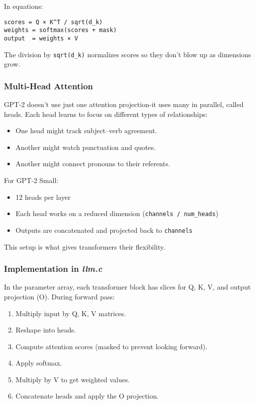 \documentclass[
  letterpaper,
  DIV=11,
  numbers=noendperiod]{scrreprt}
\providecommand{\tightlist}{%
  \setlength{\itemsep}{0pt}\setlength{\parskip}{0pt}}
\begin{document}
In equations:

\begin{verbatim}
scores = Q × K^T / sqrt(d_k)
weights = softmax(scores + mask)
output  = weights × V
\end{verbatim}

The division by \texttt{sqrt(d\_k)} normalizes scores so they don't blow
up as dimensions grow.

\subsubsection{Multi-Head Attention}\label{multi-head-attention}

GPT-2 doesn't use just one attention projection-it uses many in
parallel, called heads. Each head learns to focus on different types of
relationships:

\begin{itemize}
\tightlist
\item
  One head might track subject--verb agreement.
\item
  Another might watch punctuation and quotes.
\item
  Another might connect pronouns to their referents.
\end{itemize}

For GPT-2 Small:

\begin{itemize}
\tightlist
\item
  12 heads per layer
\item
  Each head works on a reduced dimension
  (\texttt{channels\ /\ num\_heads})
\item
  Outputs are concatenated and projected back to \texttt{channels}
\end{itemize}

This setup is what gives transformers their flexibility.

\subsubsection{\texorpdfstring{Implementation in
\emph{llm.c}}{Implementation in llm.c}}\label{implementation-in-llm.c}

In the parameter array, each transformer block has slices for Q, K, V,
and output projection (O). During forward pass:

\begin{enumerate}
\def\labelenumi{\arabic{enumi}.}
\tightlist
\item
  Multiply input by Q, K, V matrices.
\item
  Reshape into heads.
\item
  Compute attention scores (masked to prevent looking forward).
\item
  Apply softmax.
\item
  Multiply by V to get weighted values.
\item
  Concatenate heads and apply the O projection.
\end{enumerate}
\end{document}
